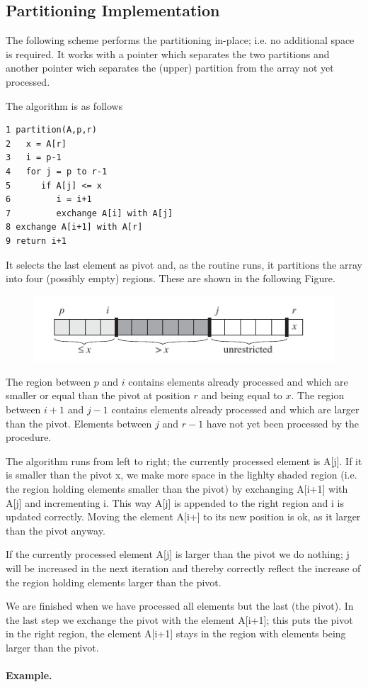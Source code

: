 \subsection{Partitioning Implementation}

The following scheme performs the partitioning in-place; i.e. no additional space is required. It works with a pointer which separates the two partitions and another pointer wich separates the (upper) partition from the array not yet processed.

The algorithm is as follows

\begin{verbatim}
1 partition(A,p,r)
2   x = A[r]
3   i = p-1
4   for j = p to r-1
5      if A[j] <= x
6         i = i+1
7         exchange A[i] with A[j]
8 exchange A[i+1] with A[r]
9 return i+1
\end{verbatim}

It selects the last element as pivot and, as the routine runs, it partitions the array into four (possibly empty) regions. These are shown in the following Figure.

\begin{figure}[hbt!]
\centering
\includegraphics[scale=0.7]{images/quicksort_1.png}
\end{figure}

The region between $p$ and $i$ contains elements already processed and which are smaller or equal than the pivot at position $r$ and being equal to $x$. The region between $i+1$ and $j-1$ contains elements already processed and which are larger than the pivot. Elements between $j$ and $r-1$ have not yet been processed by the procedure.

The algorithm runs from left to right; the currently processed element is A[j]. If it is smaller than the pivot x, we make more space in the lighlty shaded region (i.e. the region holding elements smaller than the pivot) by exchanging A[i+1] with A[j] and incrementing i. This way A[j] is appended to the right region and i is updated correctly. Moving the element A[i+] to its new position is ok, as it larger than the pivot anyway.

If the currently processed element A[j] is larger than the pivot we do nothing; j will be increased in the next iteration and thereby correctly reflect the increase of the region holding elements larger than the pivot.

We are finished when we have processed all elements but the last (the pivot). In the last step we exchange the pivot with the element A[i+1]; this puts the pivot in the right region, the element A[i+1] stays in the region with elements being larger than the pivot.

\paragraph{Example.}

